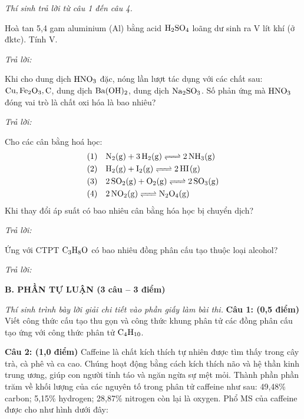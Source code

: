 \documentclass[11pt,a4paper]{article}
\begin{document}
\textit{Thí sinh trả lời từ câu 1 đến câu 4.}
\vspace{4pt}
\begin{ex}
Hoà tan 5,4 gam aluminium (Al) bằng acid $\ce{H2SO4}$ loãng dư sinh ra V lít khí (ở đktc). Tính V.
\par\textit{Trả lời:} \dotfill
\loigiai{}
\end{ex}
\begin{ex}
Khi cho dung dịch $\ce{HNO3}$ đặc, nóng lần lượt tác dụng với các chất sau: $\ce{Cu}, \ce{Fe2O3}, \ce{C}$, dung dịch $\ce{Ba(OH)2}$, dung dịch $\ce{Na2SO3}$. Số phản ứng mà $\ce{HNO3}$ đóng vai trò là chất oxi hóa là bao nhiêu?
\par\textit{Trả lời:} \dotfill
\loigiai{}
\end{ex}
\begin{ex}
Cho các cân bằng hoá học:
\begin{align*}
(1) &\quad \ce{N2(g) + 3H2(g) <=> 2NH3(g)} \\
(2) &\quad \ce{H2(g) + I2(g) <=> 2HI(g)} \\
(3) &\quad \ce{2SO2(g) + O2(g) <=> 2SO3(g)} \\
(4) &\quad \ce{2NO2(g) <=> N2O4(g)}
\end{align*}
Khi thay đổi áp suất có bao nhiêu cân bằng hóa học bị chuyển dịch?
\par\textit{Trả lời:} \dotfill
\loigiai{}
\end{ex}
\begin{ex}
Ứng với CTPT $\ce{C3H8O}$ có bao nhiêu đồng phân cấu tạo thuộc loại alcohol?
\par\textit{Trả lời:} \dotfill
\loigiai{}
\end{ex}

\vspace{6pt}
{\large\bfseries\color{mainGreen} B. PHẦN TỰ LUẬN (3 câu -- 3 điểm)}

\textit{Thí sinh trình bày lời giải chi tiết vào phần giấy làm bài thi.}
\vspace{4pt}
\textbf{Câu 1: (0,5 điểm)} Viết công thức cấu tạo thu gọn và công thức khung phân tử các đồng phân cấu tạo ứng với công thức phân tử $\ce{C4H10}$.

\vspace{2pt}

\vspace{4pt}
\textbf{Câu 2: (1,0 điểm)} Caffeine là chất kích thích tự nhiên được tìm thấy trong cây trà, cà phê và ca cao. Chúng hoạt động bằng cách kích thích não và hệ thần kinh trung ương, giúp con người tỉnh táo và ngăn ngừa sự mệt mỏi. Thành phần phần trăm về khối lượng của các nguyên tố trong phân tử caffeine như sau: 49,48\% carbon; 5,15\% hydrogen; 28,87\% nitrogen còn lại là oxygen. Phổ MS của caffeine được cho như hình dưới đây:
\end{document}
